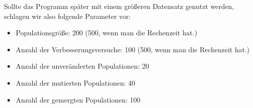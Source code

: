 Sollte das Programm später mit einem größeren Datensatz genutzt werden, schlagen wir also folgende Parameter vor:
  \begin{itemize}
\itemsep2pt
  \item Populationsgröße: 200 (500, wenn man die Rechenzeit hat.)
  \item Anzahl der Verbesserungsversuche: 100 (500, wenn man die Rechenzeit hat.)
  \item Anzahl der unveränderten Populationen: 20
  \item Anzahl der mutierten Populationen: 40
  \item Anzahl der gemergten Populationen: 100
  \end{itemize}
